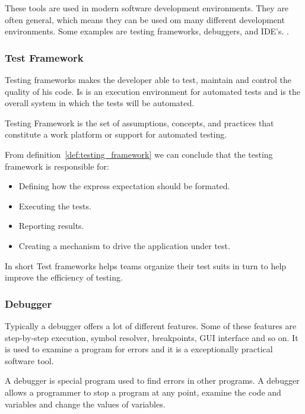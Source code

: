These tools are used in modern software development environments. They are often general, which means they can be used om many different development environments. Some examples are testing frameworks, debuggers, and IDE's. .

 \subsubsection{Test Framework} %
 \label{ssub:test_framework}

Testing frameworks makes the developer able to test, maintain and control the quality of his code. Is is an execution environment for automated tests and is the overall system in which the tests will be automated.

\begin{mydef}
  \label{def:testing_framework}
  Testing Framework is the set of assumptions, concepts, and practices that constitute a work platform or support for automated testing.
\end{mydef}

From definition~\ref{def:testing_framework} we can conclude that the testing framework is responsible for:

\begin{itemize}
  \item Defining how the express expectation should be formated.
  \item Executing the tests.
  \item Reporting results.
  \item Creating a mechanism to drive the application under test.
\end{itemize}

In short Test frameworks helps teams organize their test suits in turn to help improve the efficiency of testing.

\subsubsection{Debugger} %
\label{ssub:debugger}
 Typically a debugger offers a lot of different features. Some of these features are step-by-step execution, symbol resolver, breakpoints, GUI interface and so on. It is used to examine a program for errors and it is a exceptionally practical software tool.

\begin{mydef}
\label{def:debugger}
A debugger is special program used to find errors in other programs. A debugger allows a programmer to stop a program at any point, examine the code and variables and change the values of variables.
\end{mydef}

